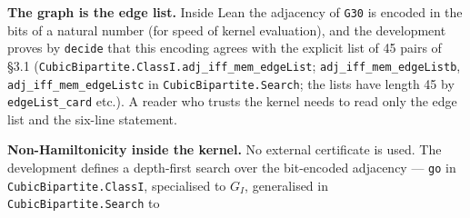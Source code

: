 \documentclass[11pt,a4paper]{article}
\theoremstyle{named}
\begin{document}
\textbf{The graph is the edge list.} Inside Lean the adjacency of \texttt{G30} is encoded in the bits of a natural number (for speed of kernel evaluation), and the development proves by \texttt{decide} that this encoding agrees with the explicit list of 45 pairs of §3.1 (\texttt{CubicBipartite.\allowbreak{}ClassI.\allowbreak{}adj\_\allowbreak{}iff\_\allowbreak{}mem\_\allowbreak{}edgeList}; \texttt{adj\_\allowbreak{}iff\_\allowbreak{}mem\_\allowbreak{}edgeListb}, \texttt{adj\_\allowbreak{}iff\_\allowbreak{}mem\_\allowbreak{}edgeListc} in \texttt{CubicBipartite.\allowbreak{}Search}; the lists have length 45 by \texttt{edgeList\_\allowbreak{}card} etc.). A reader who trusts the kernel needs to read only the edge list and the six-line statement.

\textbf{Non-Hamiltonicity inside the kernel.} No external certificate is used. The development defines a depth-first search over the bit-encoded adjacency — \texttt{go} in \texttt{CubicBipartite.\allowbreak{}ClassI}, specialised to $G_I$, generalised in \texttt{CubicBipartite.\allowbreak{}Search} to
\end{document}
